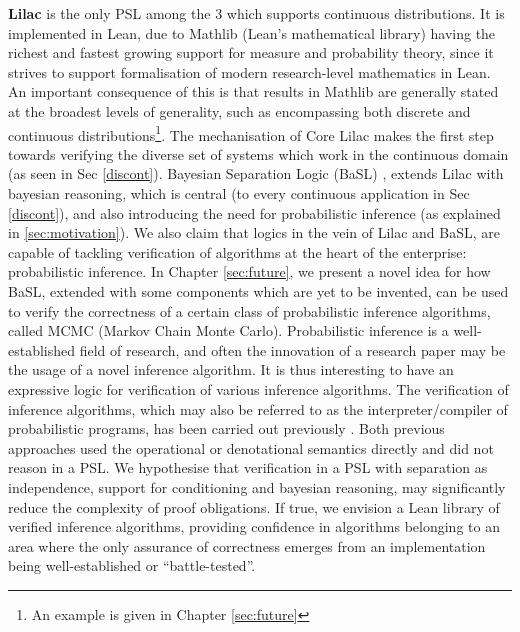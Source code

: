 \textbf{Lilac} \citep{lilac} is the only PSL among the 3 which supports continuous distributions. It is implemented in Lean, due to Mathlib (Lean's mathematical library) having the richest and fastest growing support
for measure and probability theory, since it strives to support formalisation of modern research-level mathematics in Lean. An important consequence of this is that results in Mathlib are generally stated at the broadest
levels of generality, such as encompassing both discrete and continuous distributions\footnote{An example is given in Chapter \ref{sec:future}}. The mechanisation of Core Lilac makes the first step towards verifying
the diverse set of systems which work in the continuous domain (as seen in Sec \ref{discont}). Bayesian Separation Logic (BaSL) \citep{basl}, extends Lilac with bayesian reasoning, which is central (to every continuous application in Sec \ref{discont}),
 and also introducing the need for probabilistic inference (as explained in \ref{sec:motivation}). We also claim that logics in the vein of Lilac and BaSL, are capable of tackling
verification of algorithms at the heart of the enterprise: probabilistic inference. In Chapter \ref{sec:future}, we present a novel idea for how BaSL, extended with some components which are yet to be invented, 
can be used to verify the correctness of a certain class of probabilistic
inference algorithms, called MCMC (Markov Chain Monte Carlo). Probabilistic inference is a well-established field of research, and often the innovation of a research paper may be the usage of a novel inference algorithm. It is thus
interesting to have an expressive logic for verification of various inference algorithms. The verification of inference algorithms, which may also be referred to as the interpreter/compiler of probabilistic programs,
has been carried out previously \citep{tassarotti,scibior_2017}. Both previous approaches used the operational or denotational semantics directly and did not reason in a PSL. We hypothesise that verification
in a PSL with separation as independence, support for conditioning and bayesian reasoning, may significantly reduce the complexity of proof obligations. If true, we envision a Lean library of verified inference algorithms,
providing confidence in algorithms belonging to an area where the only assurance of correctness emerges from an implementation being well-established or ``battle-tested''. 


